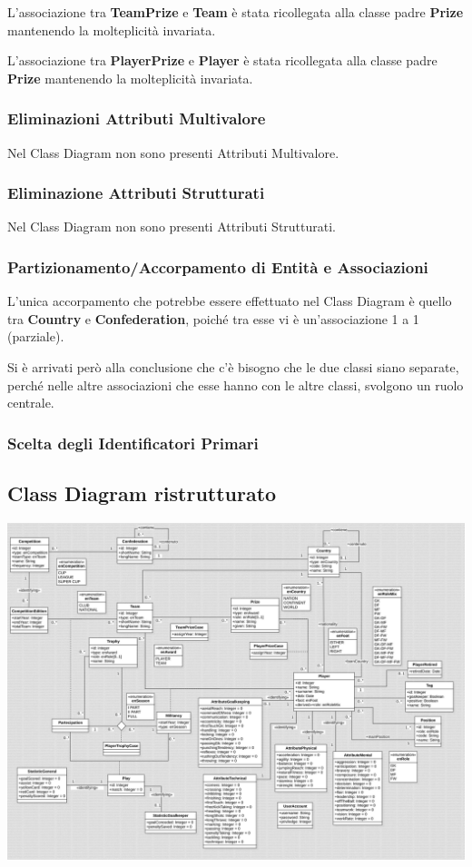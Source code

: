 L'associazione tra \textbf{TeamPrize} e 
\textbf{Team} è stata ricollegata alla classe padre 
\textbf{Prize} mantenendo la molteplicità invariata.

L'associazione tra \textbf{PlayerPrize} e 
\textbf{Player} è stata ricollegata alla classe 
padre \textbf{Prize} mantenendo la molteplicità invariata.

\newpage
\subsubsection{Eliminazioni Attributi Multivalore}
\bigskip

Nel Class Diagram non sono presenti Attributi Multivalore.

\bigskip
\subsubsection{Eliminazione Attributi Strutturati}
\bigskip

Nel Class Diagram non sono presenti Attributi Strutturati.

\bigskip
\subsubsection{Partizionamento/Accorpamento di Entità
		e Associazioni}
\bigskip

L'unica accorpamento che potrebbe essere effettuato nel Class 
Diagram è quello tra \textbf{Country} e 
\textbf{Confederation}, poiché tra esse vi è un'associazione 
1 a 1 (parziale).

Si è arrivati però alla conclusione che c'è bisogno che le 
due classi siano separate, perché nelle altre associazioni 
che esse hanno con le altre classi, svolgono un ruolo 
centrale.

\newpage
\bigskip
\subsubsection{Scelta degli Identificatori Primari}
\bigskip

\newpage
\subsection{Class Diagram ristrutturato}
\includegraphics[width=\textwidth]{res/class_diagram_ristr}
\newpage

